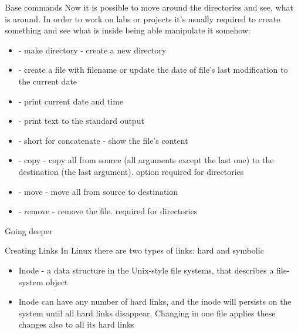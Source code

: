 \documentclass[usenames,dvipsnames,10pt,aspectratio=169]{beamer}
\begin{document}
\begin{frame}{Base commands}
    Now it is possible to move around the directories and see, what is around. In order to work on labs or projects it's usually required to create something and see what is inside being able manipulate it somehow: \newline
    \begin{itemize}
        \item {} - make directory - create a new directory
        \item {} - create a file with filename or update the date of file's last modification to the current date
        \item {} - print current date and time
        \item {} - print text to the standard output
        \item {} - short for concatenate - show the file's content
        \item {} - copy - copy all from source (all arguments except the last one) to the destination (the last argument).  option required for directories
        \item {} - move - move all from source to destination
        \item {} - remove - remove the file.  required for directories
    \end{itemize}
\end{frame}

\begin{frame}{Going deeper}

    {\Large Creating Links} \newline
    In Linux there are two types of links: hard and symbolic
    \begin{itemize}
        \item Inode - a data structure in the Unix-style file systems, that describes a file-system object
        \item Inode can have any number of hard links, and the inode will persists on the system until all hard links disappear. Changing in one file applies these changes also to all its hard links
    \end{itemize}
\end{frame}
\end{document}
